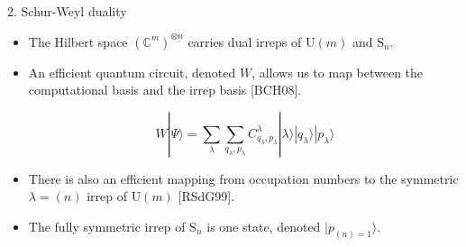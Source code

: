 \documentclass[]{templates/poster}
\begin{document}
\begin{frame}{}
\begin{columns}[t]
\begin{column}{0.422\linewidth}
  \begin{block}{\Large 2. Schur-Weyl duality}
  \begin{itemize}
  \item The Hilbert space $(\mathbb{C}^{m})^{\otimes n}$ carries dual irreps of $\textrm{U}(m)$ and $\textrm{S}_n$.
  \item An efficient quantum circuit, denoted $W$, allows us to map between the computational basis and the irrep basis [BCH08].
  
  $$W|\Psi\rangle = \sum_\lambda\sum_{q_{\lambda},p_{\lambda}}C^\lambda_{q_\lambda,p_\lambda}|\lambda\rangle|q_{\lambda}\rangle|p_\lambda\rangle$$
  
  \item There is also an efficient mapping from occupation numbers to the symmetric $\lambda=(n)$ irrep of $\textrm{U}(m)$ [RSdG99].
  \item The fully symmetric irrep of $\textrm{S}_n$ is one state, denoted $|p_{(n)=1}\rangle$.
  \end{itemize}
  \end{block}


\end{column}
\end{columns}
\end{frame}
\end{document}
